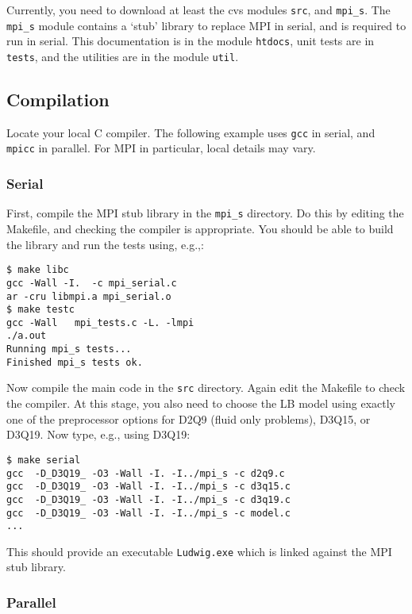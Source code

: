 Currently, you need to download at least the cvs modules \texttt{src},
and \texttt{mpi\_s}. The \texttt{mpi\_s} module contains a `stub'
library to replace MPI in serial, and is required to run in serial.
This documentation is in the module
\texttt{htdocs}, unit tests are in \texttt{tests}, and the utilities
are in the module \texttt{util}.


\subsection{Compilation}

Locate your local C compiler. The following example uses \texttt{gcc}
in serial, and \texttt{mpicc} in parallel. For MPI in particular,
local details may vary.

\subsubsection{Serial}

First, compile the MPI stub library in the \texttt{mpi\_s}
directory. Do this by editing the Makefile, and checking the compiler
is appropriate. You should be able to build the library and run the
tests using, e.g.,:

\begin{verbatim}
$ make libc
gcc -Wall -I.  -c mpi_serial.c
ar -cru libmpi.a mpi_serial.o
$ make testc
gcc -Wall   mpi_tests.c -L. -lmpi
./a.out
Running mpi_s tests...
Finished mpi_s tests ok.
\end{verbatim}

Now compile the main code in the \texttt{src} directory. Again
edit the Makefile to check the compiler. At this stage, you also
need to choose the LB model using exactly one of the preprocessor
options for D2Q9 (fluid only problems), D3Q15, or D3Q19. Now type,
e.g., using D3Q19:

\begin{verbatim}
$ make serial
gcc  -D_D3Q19_ -O3 -Wall -I. -I../mpi_s -c d2q9.c
gcc  -D_D3Q19_ -O3 -Wall -I. -I../mpi_s -c d3q15.c
gcc  -D_D3Q19_ -O3 -Wall -I. -I../mpi_s -c d3q19.c
gcc  -D_D3Q19_ -O3 -Wall -I. -I../mpi_s -c model.c
...
\end{verbatim}

This should provide an executable \texttt{Ludwig.exe} which is linked
against the MPI stub library.

\subsubsection{Parallel}

